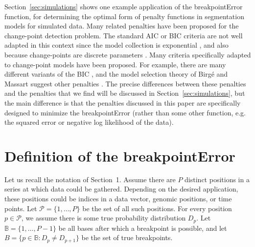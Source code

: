 \documentclass{jsfds} %
\begin{document}
Section~\ref{sec:simulations} shows one example application of the
breakpointError function, for determining the optimal form of penalty
functions in segmentation models for simulated data. Many related
penalties have been proposed for the change-point detection
problem. The standard AIC or BIC criteria are not well adapted in this
context since the model collection is exponential
\citep{BM04,BIC,Akaike73,BGH09}, and also because change-points are
discrete parameters \citep{mBIC}.  Many criteria specifically adapted
to change-point models have been proposed.  For example, there are
many different variants of the BIC \citep{Yao88,Lee95,mBIC}, and the
model selection theory of Birg\'e and Massart suggest other penalties
\citep{lavielle2005,lebarbier,BM04,calibration}. The precise
differences between these penalties and the penalties that we find
will be discussed in Section~\ref{sec:simulations}, but the main
difference is that the penalties discussed in this paper are
specifically designed to minimize the breakpointError (rather than
some other function, e.g. the squared error or negative log likelihood
of the data).


\newpage

\section{Definition of the breakpointError}
\label{sec:definition}

Let us recall the notation of Section~1. Assume there are $P$ distinct
positions in a series at which data could be gathered. Depending on
the desired application, these positions could be indices in a data
vector, genomic positions, or time points. Let $\mathcal P=
\{1,\dots,P\}$ be the set of all such positions. For every position
$p\in\mathcal P$, we assume there is some true probability
distribution $D_p$. Let $\mathbb B=\{1,\dots,P-1\}$ be all bases after
which a breakpoint is possible, and let $B = \{p\in \mathbb B : D_p
\neq D_{p+1}\}$ be the set of true breakpoints.
\end{document}
